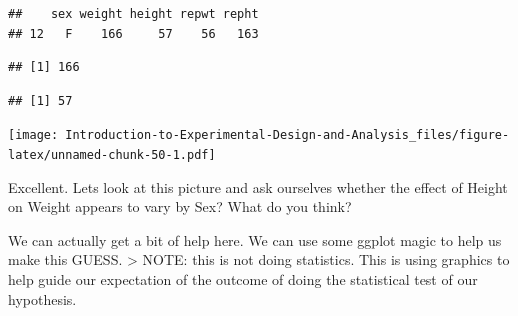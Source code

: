 \documentclass[
]{book}
\newenvironment{Shaded}{\begin{snugshade}}{\end{snugshade}}
\newcommand{\AttributeTok}[1]{\textcolor[rgb]{0.77,0.63,0.00}{#1}}
\newcommand{\CommentTok}[1]{\textcolor[rgb]{0.56,0.35,0.01}{\textit{#1}}}
\newcommand{\DecValTok}[1]{\textcolor[rgb]{0.00,0.00,0.81}{#1}}
\newcommand{\FunctionTok}[1]{\textcolor[rgb]{0.00,0.00,0.00}{#1}}
\newcommand{\NormalTok}[1]{#1}
\newcommand{\OtherTok}[1]{\textcolor[rgb]{0.56,0.35,0.01}{#1}}
\newcommand{\SpecialCharTok}[1]{\textcolor[rgb]{0.00,0.00,0.00}{#1}}
\begin{document}
\begin{verbatim}
##    sex weight height repwt repht
## 12   F    166     57    56   163
\end{verbatim}

\begin{Shaded}
\end{Shaded}

\begin{verbatim}
## [1] 166
\end{verbatim}

\begin{Shaded}
\end{Shaded}

\begin{verbatim}
## [1] 57
\end{verbatim}

\begin{Shaded}
\end{Shaded}

\texttt{[image: Introduction-to-Experimental-Design-and-Analysis\_files/figure-latex/unnamed-chunk-50-1.pdf]}

Excellent. Lets look at this picture and ask ourselves whether the effect of Height on Weight appears to vary by Sex? What do you think?

We can actually get a bit of help here. We can use some ggplot magic to help us make this GUESS.
\textgreater{} NOTE: this is not doing statistics. This is using graphics to help guide our expectation of the outcome of doing the statistical test of our hypothesis.
\end{document}
